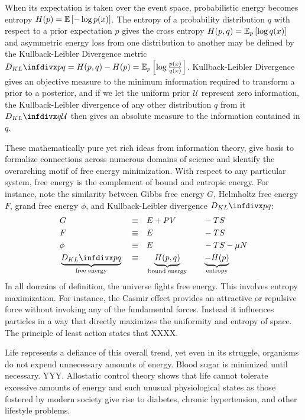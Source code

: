 \documentclass{article}
\begin{document}
When its expectation is taken over the event space, probabilistic energy becomes entropy $H(p) = \expectation{-\log{p(x)}}$. The entropy of a probability distribution $q$ with respect to a prior expectation $p$ gives the cross entropy $H(p,q) = \expectation[p]{ \log{ q(x) } }$ and asymmetric energy loss from one distribution to another may be defined by the Kullback-Leibler Divergence metric $\kld{p}{q} = H(p,q) - H(p) = \expectation[p]{ \log {\frac {p(x)}{q(x)} } }$. Kullback-Leibler Divergence gives an objective measure to the minimum information required to transform a prior to a posterior, and if we let the uniform prior $\mathcal{U}$ represent zero information, the Kullback-Leibler divergence of any other distribution $q$ from it $\kld{q}{\mathcal{U}}$ then gives an absolute measure to the information contained in $q$. 

These mathematically pure yet rich ideas from information theory, give basis to formalize connections across numerous domains of science and identify the overarching motif of free energy minimization. With respect to any particular system, free energy is the complement of bound and entropic energy. For instance, note the similarity between Gibbs free energy $G$, Helmholtz free energy $F$, grand free energy $\phi$, and Kullback-Leibler divergence $\kld{p}{q}$:
\begin{alignat*}{4}
& G    && \equiv && {} E + PV \quad && - TS \\
& F    && \equiv && {} E      \quad && - TS \\
& \phi && \equiv && {} E      \quad && - TS - \mu N \\
& \underbrace{\kld{p}{q}}_{\text{free energy}} && \equiv && {} \underbrace{H(p,q)}_{\text{bound energy}} \quad && \underbrace{- H(p)}_{\text{entropy}}
\end{alignat*}
In all domains of definition, the universe fights free energy. This involves entropy maximization. For instance, the Casmir effect provides an attractive or repulsive force without invoking any of the fundamental forces. Instead it influences particles in a way that directly maximizes the uniformity and entropy of space. The principle of least action states that XXXX.

Life represents a defiance of this overall trend, yet even in its struggle, organisms do not expend unnecessary amounts of energy. Blood sugar is minimized until necessary. YYY. Allostatic control theory shows that life cannot tolerate excessive amounts of energy and such unusual physiological states as those fostered by modern society give rise to diabetes, chronic hypertension, and other lifestyle problems.
\end{document}
